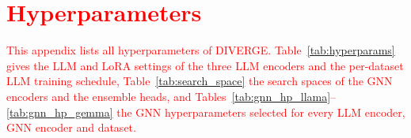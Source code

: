 \documentclass[a4paper,fleqn]{cas-sc}
\newcommand{\revone}[1]{\textcolor{red}{#1}}   %
\begin{document}
%
\FloatBarrier





\clearpage
\appendix
\section{\revone{Hyperparameters}}\label{app:hyperparams}

\revone{This appendix lists all hyperparameters of DIVERGE. Table~\ref{tab:hyperparams} gives the LLM and LoRA settings of the three LLM encoders and the per-dataset LLM training schedule, Table~\ref{tab:search_space} the search spaces of the GNN encoders and the ensemble heads, and Tables~\ref{tab:gnn_hp_llama}--\ref{tab:gnn_hp_gemma} the GNN hyperparameters selected for every LLM encoder, GNN encoder and dataset.}
\end{document}
